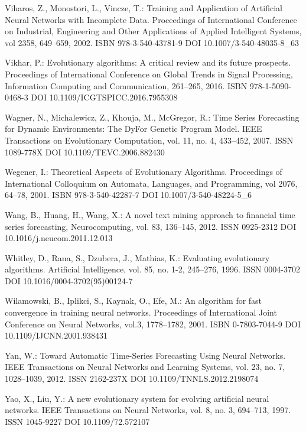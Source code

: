 \begin{thebibliography}{99.}
 Viharos, Z., Monostori, L., Vincze, T.: Training and Application of Artificial Neural Networks with Incomplete Data. Proceedings of International Conference on Industrial, Engineering and Other Applications of Applied Intelligent Systems, vol 2358, 649--659, 2002. ISBN 978-3-540-43781-9 DOI 10.1007/3-540-48035-8\_63

 Vikhar, P.: Evolutionary algorithms: A critical review and its future prospects. Proceedings of International Conference on Global Trends in Signal Processing, Information Computing and Communication, 261--265, 2016. ISBN 978-1-5090-0468-3 DOI 10.1109/ICGTSPICC.2016.7955308

 Wagner, N., Michalewicz, Z., Khouja, M., McGregor, R.: Time Series Forecasting for Dynamic Environments: The DyFor Genetic Program Model. IEEE Transactions on Evolutionary Computation, vol. 11, no. 4, 433--452, 2007. ISSN 1089-778X DOI 10.1109/TEVC.2006.882430

 Wegener, I.: Theoretical Aspects of Evolutionary Algorithms. Proceedings of International Colloquium on Automata, Languages, and Programming, vol 2076, 64--78, 2001. ISBN 978-3-540-42287-7 DOI 10.1007/3-540-48224-5\_6

 Wang, B., Huang, H., Wang, X.: A novel text mining approach to financial time series forecasting, Neurocomputing, vol. 83, 136--145, 2012. ISSN 0925-2312 DOI 10.1016/j.neucom.2011.12.013

 Whitley, D., Rana, S., Dzubera, J., Mathias, K.: Evaluating evolutionary algorithms. Artificial Intelligence, vol. 85, no. 1-2, 245--276, 1996. ISSN 0004-3702 DOI 10.1016/0004-3702(95)00124-7

 Wilamowski, B., Iplikci, S., Kaynak, O., Efe, M.: An algorithm for fast convergence in training neural networks. Proceedings of International Joint Conference on Neural Networks, vol.3, 1778--1782, 2001. ISBN 0-7803-7044-9 DOI 10.1109/IJCNN.2001.938431

 Yan, W.: Toward Automatic Time-Series Forecasting Using Neural Networks. IEEE Transactions on Neural Networks and Learning Systems, vol. 23, no. 7, 1028--1039, 2012. ISSN 2162-237X DOI 10.1109/TNNLS.2012.2198074

 Yao, X., Liu, Y.: A new evolutionary system for evolving artificial neural networks. IEEE Transactions on Neural Networks, vol. 8, no. 3, 694--713, 1997. ISSN 1045-9227 DOI 10.1109/72.572107


\end{thebibliography}
